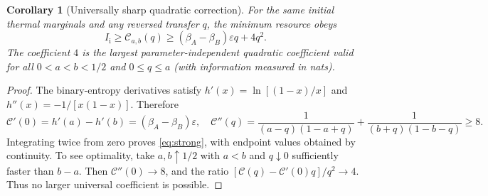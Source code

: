 \documentclass[11pt,a4paper]{article}
\newtheorem{corollary}[theorem]{Corollary}
\newcommand{\eps}{\varepsilon}
\begin{document}
\begin{corollary}[Universally sharp quadratic correction]\label{co:quadratic}
For the same initial thermal marginals and any reversed transfer $q$, the minimum resource obeys
\begin{equation}\label{eq:strong}
\boxed{\quad I_{\mathrm i}\ge \mathcal C_{a,b}(q)
\ge (\beta_A-\beta_B)\eps q+4q^2.\quad}
\end{equation}
The coefficient $4$ is the largest parameter-independent quadratic coefficient valid for all $0<a<b<1/2$ and $0\le q\le a$ (with information measured in nats).
\end{corollary}
\begin{proof}
The binary-entropy derivatives satisfy $h'(x)=\ln[(1-x)/x]$ and $h''(x)=-1/[x(1-x)]$. Therefore
\[
\mathcal C'(0)=h'(a)-h'(b)=(\beta_A-\beta_B)\eps,
\quad \mathcal C''(q)=\frac{1}{(a-q)(1-a+q)}+\frac{1}{(b+q)(1-b-q)}\ge8.
\]
Integrating twice from zero proves \eqref{eq:strong}, with endpoint values obtained by continuity. To see optimality, take $a,b\uparrow1/2$ with $a<b$ and $q\downarrow0$ sufficiently faster than $b-a$. Then $\mathcal C''(0)\to8$, and the ratio $[\mathcal C(q)-\mathcal C'(0)q]/q^2\to4$. Thus no larger universal coefficient is possible.
\end{proof}
\end{document}
